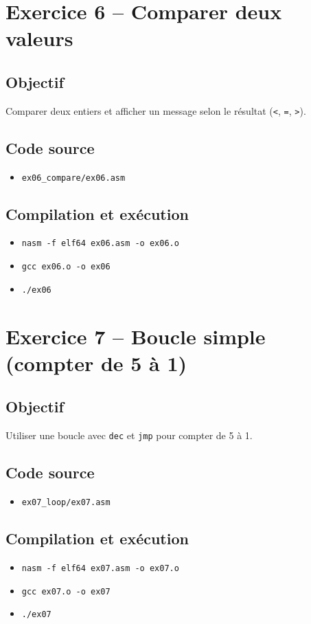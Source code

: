 \documentclass[11pt]{article}
\begin{document}
\section{Exercice 6 -- Comparer deux valeurs}
\subsection*{Objectif}
Comparer deux entiers et afficher un message selon le résultat (\texttt{<}, \texttt{=}, \texttt{>}).

\subsection*{Code source}
\begin{itemize}[noitemsep]
    \item \texttt{ex06\_compare/ex06.asm}
\end{itemize}

\subsection*{Compilation et exécution}
\begin{itemize}[noitemsep]
    \item \texttt{nasm -f elf64 ex06.asm -o ex06.o}
    \item \texttt{gcc ex06.o -o ex06}
    \item \texttt{./ex06}
\end{itemize}

\section{Exercice 7 -- Boucle simple (compter de 5 à 1)}
\subsection*{Objectif}
Utiliser une boucle avec \texttt{dec} et \texttt{jmp} pour compter de 5 à 1.

\subsection*{Code source}
\begin{itemize}[noitemsep]
    \item \texttt{ex07\_loop/ex07.asm}
\end{itemize}

\subsection*{Compilation et exécution}
\begin{itemize}[noitemsep]
    \item \texttt{nasm -f elf64 ex07.asm -o ex07.o}
    \item \texttt{gcc ex07.o -o ex07}
    \item \texttt{./ex07}
\end{itemize}
\end{document}
